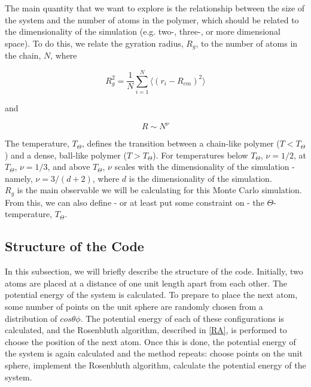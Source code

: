 \documentclass{article}
\begin{document}
\begin{multicols}{2}
The main quantity that we want to explore is the relationship between the size of the system and the number of atoms in the polymer, which should be related to the dimensionality of the simulation (e.g. two-, three-, or more dimensional space).  To do this, we relate the gyration radius, $R_g$, to the number of atoms in the chain, $N$, where 

\begin{equation}
\label{rg}
R_g^2 = \frac{1}{N} \sum \limits _{i=1}^{N} \langle (r_i - R_{cm})^2 \rangle
\end{equation} 

\noindent and 

\begin{equation}
\label{RNcomparison}
R \sim N^{\nu}
\end{equation}

The temperature, $T_{\Theta}$, defines the transition between a chain-like polymer ($T<T_{\Theta}$) and a dense, ball-like polymer ($T>T_{\Theta}$).  For temperatures below $T_{\Theta}$, $\nu = 1/ 2$, at $T_{\Theta}$, $\nu = 1/3$, and above $T_{\Theta}$, $\nu$ scales with the dimensionality of the simulation - namely, $\nu = 3/(d+2)$, where $d$ is the dimensionality of the simulation.  \cite{PhilNotes}\\

$R_g$ is the main observable we will be calculating for this Monte Carlo simulation.  From this, we can also define - or at least put some constraint on - the $\Theta $-temperature, $T_{\Theta}$.

\subsection{Structure of the Code}

In this subsection, we will briefly describe the structure of the code.  Initially, two atoms are placed at a distance of one unit length apart from each other.  The potential energy of the system is calculated.  To prepare to place the next atom, some number of points on the unit sphere are randomly chosen from a distribution of $cos\theta \phi$.  The potential energy of each of these configurations is calculated, and the Rosenbluth algorithm, described in \ref{RA}, is performed to choose the position of the next atom.  Once this is done, the potential energy of the system is again calculated and the method repeats:  choose points on the unit sphere, implement the Rosenbluth algorithm, calculate the potential energy of the system.  \\


\end{multicols}
\end{document}
